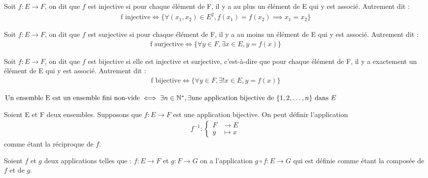 \begin{definition}[Injectivité]
	Soit $f:E \to F$, on dit que $f$ est injective si pour chaque élément de F, il y a au plus un élément de E qui y est associé. Autrement dit :
	\begin{align*}
		\text{f injective} \iff \{\forall (x_1, x_2) \in E^2, f(x_1) = f(x_2) \implies x_1 = x_2\}
	\end{align*}
\end{definition}

\begin{definition}[Surjectivité]
	Soit $f:E \to F$, on dit que $f$ est surjective si pour chaque élément de F, il y a au moins un élément de E qui y est associé.
	Autrement dit :
	\begin{align*}
		\text{f surjective} \iff \{\forall y \in F, \exists x \in E, y = f(x)\}
	\end{align*}
\end{definition}

\begin{definition}[Bijectivité]
	Soit $f:E \to F$, on dit que $f$ est bijective si elle est injective et surjective, c'est-à-dire que pour chaque élément de F, il y a exactement un élément de E qui y est associé.
	Autrement dit :
	\begin{align*}
		\text{f bijective} \iff \{\forall y \in F, \exists! x \in E, y = f(x)\}
	\end{align*}
\end{definition}

\begin{definition}
	$
		\text{Un ensemble E est un ensemble fini non-vide} \iff \exists n \in \mathbb{N}^*, \exists \text{une application bijective de } \{1,2,\ldots,n\} \text{ dans } E
	$
\end{definition}

\begin{definition}
	Soient E et F deux ensembles. Supposons que $f:E \to F$ est une application bijective. On peut définir l'application 
	\begin{align*}
		f^{-1} : 
		\begin{cases}
			F &\to E \\
			y &\mapsto x
		\end{cases}
	\end{align*}
	comme étant la réciproque de $f$.
\end{definition}

\begin{definition}[Composition]
	Soient $f$ et $g$ deux applications telles que :
	$f:E \to F$ et $g:F \to G$ on a l'application $g \circ f : E \to G$ qui est définie comme étant la composée de $f$ et de $g$.
\end{definition}

